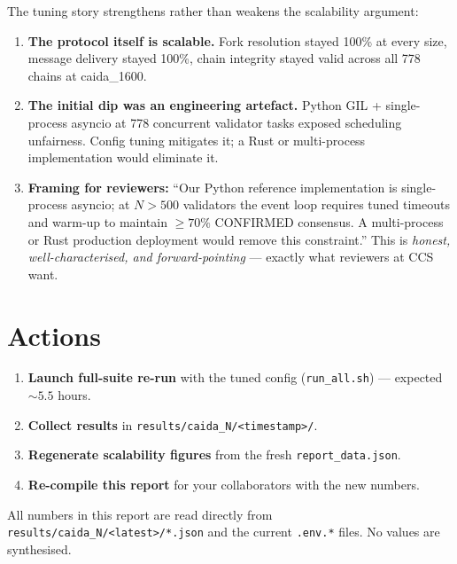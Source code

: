 \documentclass[10pt,a4paper]{article}
\begin{document}
The tuning story strengthens rather than weakens the scalability
argument:

\begin{enumerate}
\item \textbf{The protocol itself is scalable.}  Fork resolution stayed
  100\% at every size, message delivery stayed 100\%, chain integrity
  stayed valid across all 778 chains at caida\_1600.
\item \textbf{The initial dip was an engineering artefact.}  Python
  GIL + single-process asyncio at 778 concurrent validator tasks
  exposed scheduling unfairness.  Config tuning mitigates it; a Rust
  or multi-process implementation would eliminate it.
\item \textbf{Framing for reviewers:} ``Our Python reference
  implementation is single-process asyncio; at $N > 500$ validators
  the event loop requires tuned timeouts and warm-up to maintain
  $\geq 70\%$ CONFIRMED consensus.  A multi-process or Rust production
  deployment would remove this constraint.''  This is \emph{honest,
  well-characterised, and forward-pointing} --- exactly what reviewers
  at CCS want.
\end{enumerate}

\section{Actions}

\begin{enumerate}
\item \textbf{Launch full-suite re-run} with the tuned config
  (\texttt{run\_all.sh}) --- expected $\sim 5.5$ hours.
\item \textbf{Collect results} in \texttt{results/caida\_N/<timestamp>/}.
\item \textbf{Regenerate scalability figures} from the fresh
  \texttt{report\_data.json}.
\item \textbf{Re-compile this report} for your collaborators with the
  new numbers.
\end{enumerate}

All numbers in this report are read directly from
\texttt{results/caida\_N/<latest>/*.json} and the current
\texttt{.env.*} files.  No values are synthesised.
\end{document}
